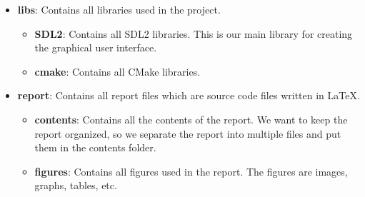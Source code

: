 \begin{itemize}
\begin{itemize}
    \end{itemize}
    \item \textbf{libs}: Contains all libraries used in the project.
    \begin{itemize}
        \item \textbf{SDL2}: Contains all SDL2 libraries. This is our main library for creating the graphical user interface.
        \item \textbf{cmake}: Contains all CMake libraries.
    \end{itemize}
    \item \textbf{report}: Contains all report files which are source code files written in LaTeX.
    \begin{itemize}
        \item \textbf{contents}: Contains all the contents of the report. We want to keep the report organized, so we separate the report into multiple files and put them in the contents folder.
        \item \textbf{figures}: Contains all figures used in the report. The figures are images, graphs, tables, etc.
    \end{itemize}
\end{itemize}

